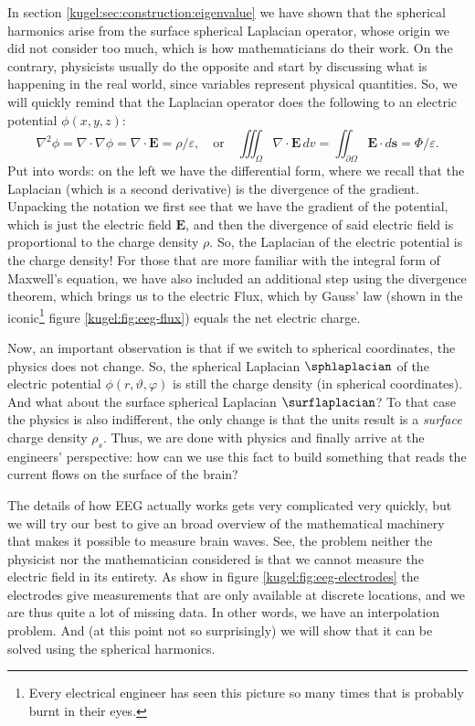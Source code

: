 In section \ref{kugel:sec:construction:eigenvalue} we have shown that the
spherical harmonics arise from the surface spherical Laplacian operator, whose
origin we did not consider too much, which is how mathematicians do their work.
On the contrary, physicists usually do the opposite and start by discussing what
is happening in the real world, since variables represent physical quantities.
So, we will quickly remind that the Laplacian operator does the following to an
electric potential $\phi(x, y, z)$:
\begin{equation*}
  \nabla^2 \phi
  = \nabla \cdot \nabla \phi
  = \nabla \cdot \mathbf{E}
  = \rho / \varepsilon,
  \quad \text{or} \quad
  \iiint_\Omega \nabla \cdot \mathbf{E} \, dv
  = \iint_{\partial \Omega} \mathbf{E} \cdot d\mathbf{s}
  = \Phi / \varepsilon.
\end{equation*}
Put into words: on the left we have the differential form, where we recall that
the Laplacian (which is a second derivative) is the divergence of the gradient.
Unpacking the notation we first see that we have the gradient of the potential,
which is just the electric field $\mathbf{E}$, and then the divergence of said
electric field is proportional to the charge density $\rho$. So, the Laplacian
of the electric potential is the charge density! For those that are more
familiar with the integral form of Maxwell's equation, we have also included an
additional step using the divergence theorem, which brings us to the electric
Flux, which by Gauss' law (shown in the iconic\footnote{Every electrical
engineer has seen this picture so many times that is probably burnt in their
eyes.} figure \ref{kugel:fig:eeg-flux}) equals the net electric charge.

Now, an important observation is that if we switch to spherical coordinates, the
physics does not change. So, the spherical Laplacian $\sphlaplacian$ of the
electric potential $\phi(r, \vartheta, \varphi)$ is still the charge density (in
spherical coordinates). And what about the surface spherical Laplacian
$\surflaplacian$? To that case the physics is also indifferent, the only change
is that the units result is a \emph{surface} charge density $\rho_s$. Thus, we
are done with physics and finally arrive at the engineers' perspective: how can
we use this fact to build something that reads the current flows on the surface
of the brain?

The details of how EEG actually works gets very complicated very quickly, but we
will try our best to give an broad overview of the mathematical machinery that
makes it possible to measure brain waves. See, the problem neither the physicist
nor the mathematician considered is that we cannot measure the electric field in
its entirety. As show in figure \ref{kugel:fig:eeg-electrodes} the electrodes
give measurements that are only available at discrete locations, and we are thus
quite a lot of missing data. In other words, we have an interpolation problem.
And (at this point not so surprisingly) we will show that it can be solved using
the spherical harmonics.

